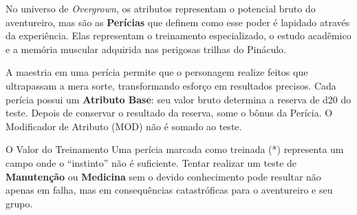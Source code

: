 

No universo de \textit{Overgrown}, os atributos representam o potencial bruto do aventureiro, mas são as \textbf{Perícias} que definem como esse poder é lapidado através da experiência. Elas representam o treinamento especializado, o estudo acadêmico e a memória muscular adquirida nas perigosas trilhas do Pináculo.

A maestria em uma perícia permite que o personagem realize feitos que ultrapassam a mera sorte, transformando esforço em resultados precisos. Cada perícia possui um \textbf{Atributo Base}: seu valor bruto determina a reserva de d20 do teste. Depois de conservar o resultado da reserva, some o bônus da Perícia. O Modificador de Atributo (MOD) não é somado ao teste.

\begin{rpgboxtips}{O Valor do Treinamento}
Uma perícia marcada como treinada (*) representa um campo onde o ``instinto'' não é suficiente. Tentar realizar um teste de \textbf{Manutenção} ou \textbf{Medicina} sem o devido conhecimento pode resultar não apenas em falha, mas em consequências catastróficas para o aventureiro e seu grupo.
\end{rpgboxtips}

